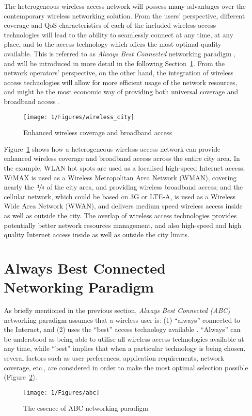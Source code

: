 The heterogeneous wireless access network will possess many advantages over the contemporary wireless networking solution. From the users' perspective, different coverage and QoS characteristics of each of the included wireless access technologies will lead to the ability to seamlessly connect at any time, at any place, and to the access technology which offers the most optimal quality available. This is referred to as \emph{Always Best Connected} networking paradigm \cite{ABC03}, and will be introduced in more detail in the following Section~\ref{sec:always_best_connected_networking_paradigm}. From the network operators' perspective, on the other hand, the integration of wireless access technologies will allow for more efficient usage of the network resources, and might be the most economic way of providing both universal coverage and broadband access \cite{HossainBeaubrun09}. 
\begin{figure}[ht]
	\centering
	\texttt{[image: 1/Figures/wireless\_city]}
	\caption{Enhanced wireless coverage and broadband access}
	\label{fig:ch1_wireless_city}
\end{figure}
Figure~\ref{fig:ch1_wireless_city} shows how a heterogeneous wireless access network can provide enhanced wireless coverage and broadband access across the entire city area. In the example, WLAN hot spots are used as a localised high-speed Internet access; WiMAX is used as a Wireless Metropolitan Area Network (WMAN), covering nearly the $\sfrac{3}{4}$ of the city area, and providing wireless broadband access; and the cellular network, which could be based on 3G or LTE-A, is used as a Wireless Wide Area Network (WWAN), and delivers medium speed wireless access inside as well as outside the city. The overlap of wireless access technologies provides potentially better network resources management, and also high-speed and high quality Internet access inside as well as outside the city limits.

\section{Always Best Connected Networking Paradigm} %
\label{sec:always_best_connected_networking_paradigm}
As briefly mentioned in the previous section, \emph{Always Best Connected (ABC)} networking paradigm assumes that a wireless user is: (1) ``always'' connected to the Internet, and (2) uses the ``best'' access technology available \cite{ABC03}. ``Always'' can be understood as being able to utilise all wireless access technologies available at any time, while ``best'' implies that when a particular technology is being chosen, several factors such as user preferences, application requirements, network coverage, etc., are considered in order to make the most optimal selection possible (Figure~\ref{fig:ch1_abc}).
\begin{figure}[ht]
	\centering
	\texttt{[image: 1/Figures/abc]}
	\caption{The essence of ABC networking paradigm}
	\label{fig:ch1_abc}
\end{figure}

